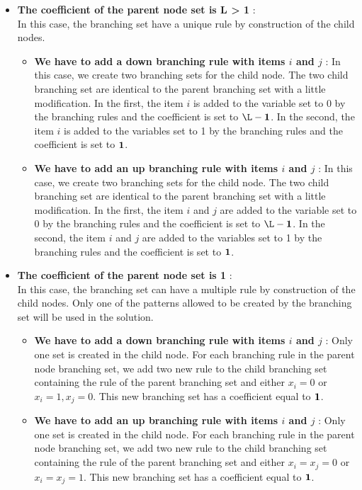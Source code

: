 \begin{itemize}
	\item \textbf{The coefficient of the parent node set is L > 1} : \\
	In this case, the branching set have a unique rule by construction of the child nodes.
	\begin{itemize}
		\item \textbf{We have to add a down branching rule with items $i$ and $j$} : In this case, we create two branching sets for the child node. The two child branching set are identical to the parent branching set with a little modification. In the first, the item $i$ is added to the variable set to 0 by the branching rules and the coefficient is set to $\L-\1$. In the second, the item $i$ is added to the variables set to 1 by the branching rules and the coefficient is set to ${\mathbf 1}$.
	\end{itemize}
	\begin{itemize}
		\item \textbf{We have to add an up branching rule with items $i$ and $j$} : In this case, we create two branching sets for the child node. The two child branching set are identical to the parent branching set with a little modification. In the first, the item $i$ and $j$ are added to the variable set to 0 by the branching rules and the coefficient is set to $\L-\1$. In the second, the item $i$ and $j$ are added to the variables set to 1 by the branching rules and the coefficient is set to ${\mathbf 1}$.
	\end{itemize}
	\item \textbf{The coefficient of the parent node set is 1} : \\
	In this case, the branching set can have a multiple rule by construction of the child nodes. Only one of the patterns allowed to be created by the branching set will be used in the solution.
	\begin{itemize}
		\item \textbf{We have to add a down branching rule with items $i$ and $j$} : Only one set is created in the child node. For each branching rule in the parent node branching set, we add two new rule to the child branching set containing the rule of the parent branching set and either $x_i = 0$ or $x_i=1, x_j=0$. This new branching set has a coefficient equal to ${\mathbf 1}$.
	\end{itemize}
	\begin{itemize}
		\item \textbf{We have to add an up branching rule with items $i$ and $j$} : Only one set is created in the child node. For each branching rule in the parent node branching set, we add two new rule to the child branching set containing the rule of the parent branching set and either $x_i = x_j = 0$ or $x_i=x_j=1$. This new branching set has a coefficient equal to ${\mathbf 1}$.
	\end{itemize}
\end{itemize}

